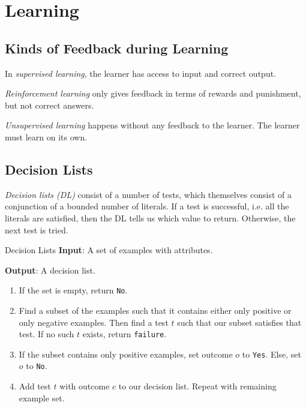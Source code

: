 \documentclass[english]{panikzettel}
\begin{document}
\section{Learning}
\subsection{Kinds of Feedback during Learning}

In \emph{supervised learning}, the learner has access to input and correct output.

\emph{Reinforcement learning} only gives feedback in terms of rewards and punishment, but not correct answers.

\emph{Unsupervised learning} happens without any feedback to the learner. The learner must learn on its own.
\vspace{-0.5\baselineskip}

\subsection{Decision Lists}
\emph{Decision lists (DL)} consist of a number of tests, which themselves consist of a conjunction of a bounded number of literals. If a test is successful, i.e. all the literals are satisfied, then the DL tells us which value to return. Otherwise, the next test is tried.

\begin{algo}{Decision Lists}
\textbf{Input}: A set of examples with attributes.

\textbf{Output}: A decision list.
\tcblower
\begin{enumerate}
    \item If the set is empty, return \texttt{No}.
    \item Find a subset of the examples such that it contains either only positive or only negative examples. Then find a test $t$ such that our subset satisfies that test. If no such $t$ exists, return \texttt{failure}.
    \item If the subset contains only positive examples, set outcome $o$ to \texttt{Yes}. Else, set $o$ to \texttt{No}.
    \item Add test $t$ with outcome $c$ to our decision list. Repeat with remaining example set.
\end{enumerate}
\end{algo}
\end{document}
